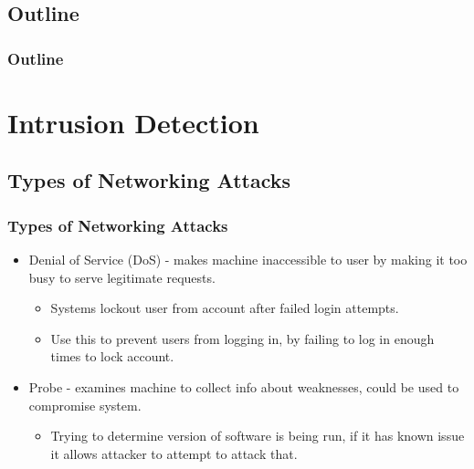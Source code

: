 \documentclass{beamer}
\newcommand{\linespace}{\vskip 0.25cm}
\begin{document}
\subsection*{Outline}

\begin{frame}
  \frametitle{Outline}
  \tableofcontents[hideallsubsections]
\end{frame}
\section[Intrusion Detection]{Intrusion Detection}
\subsection{Types of Networking Attacks}
\begin{frame}
  \frametitle{Types of Networking Attacks}
  \begin{itemize}
  	\item Denial of Service (DoS) - makes machine inaccessible to user by making it too busy to serve legitimate requests.
  	
  	\begin{itemize}
  		\item Systems lockout user from account after failed login attempts. 
  		\item Use this to prevent users from logging in, by failing to log in enough times to lock account.
  	\end{itemize}

  	\linespace
  	\linespace
  	\linespace
  	
  	\item Probe - examines machine to collect info about weaknesses, could be used to compromise system.
  	
  	\begin{itemize}
  		\item Trying to determine version of software is being run, if it has known issue it allows attacker to attempt to attack that.
  	\end{itemize}
  \end{itemize}
\end{frame}
\end{document}

